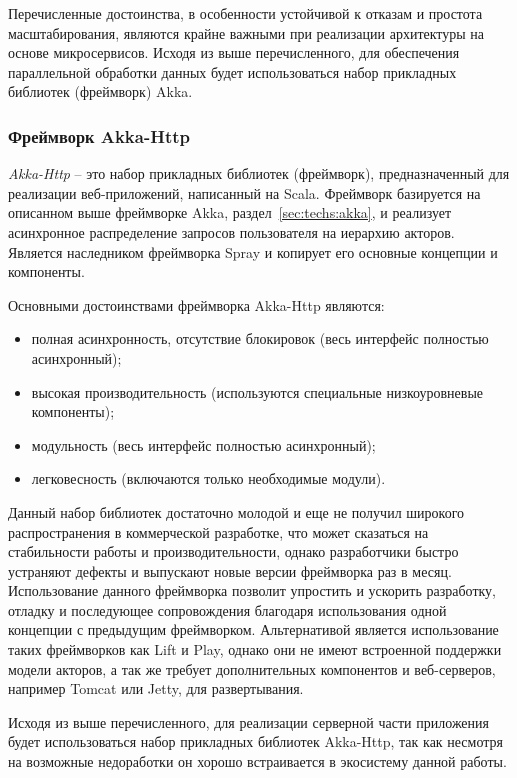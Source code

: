 Перечисленные достоинства, в особенности устойчивой к отказам и простота масштабирования, являются крайне важными при реализации архитектуры на основе микросервисов. Исходя из выше перечисленного, для обеспечения параллельной обработки данных будет использоваться набор прикладных библиотек (фреймворк) Akka.

\subsubsection{Фреймворк Akka-Http}
\label{sec:techs:akka_http}

\emph{Akka-Http} -- это набор прикладных библиотек (фреймворк), предназначенный для реализации веб-приложений, написанный на Scala. Фреймворк базируется на описанном выше фреймворке Akka, раздел~\ref{sec:techs:akka}, и реализует асинхронное распределение запросов пользователя на иерархию акторов. Является наследником фреймворка Spray и копирует его основные концепции и компоненты.

Основными достоинствами фреймворка Akka-Http являются:
\begin{itemize}
  \item полная асинхронность, отсутствие блокировок (весь интерфейс полностью асинхронный);
  \item высокая производительность (используются специальные низкоуровневые компоненты);
  \item модульность (весь интерфейс полностью асинхронный);
  \item легковесность (включаются только необходимые модули).
\end{itemize}

Данный набор библиотек достаточно молодой и еще не получил широкого распространения в коммерческой разработке, что может сказаться на стабильности работы и производительности, однако разработчики быстро устраняют дефекты и выпускают новые версии фреймворка раз в месяц. Использование данного фреймворка позволит упростить и ускорить разработку, отладку и последующее сопровождения благодаря использования одной концепции с предыдущим фреймворком.
Альтернативой является использование таких фреймворков как Lift и Play, однако они не имеют встроенной поддержки модели акторов, а так же требует дополнительных компонентов и веб-серверов, например Tomcat или Jetty, для развертывания.

Исходя из выше перечисленного, для реализации серверной части приложения будет использоваться набор прикладных библиотек Akka-Http, так как несмотря на возможные недоработки он хорошо встраивается в экосистему данной работы.

